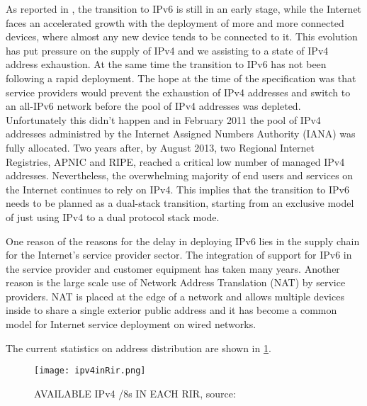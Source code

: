 \documentclass[11pt,a4paper]{scrreprt}
\begin{document}
As reported in \cite{IPv6_state}, the transition to IPv6 is still in an early stage, while the Internet faces an accelerated growth with the deployment of more and more connected devices, where almost any new device tends to be connected to it.  This evolution has put pressure on the supply of IPv4 and we assisting to a state of IPv4 address exhaustion. At the same time the transition to IPv6 has not been following a rapid deployment. The hope at the time of the specification was that service providers would prevent the exhaustion of IPv4 addresses and switch to an all-IPv6 network before the pool of IPv4 addresses was depleted. Unfortunately this didn't happen and in February 2011 the pool of IPv4 addresses administred by the Internet Assigned Numbers Authority (IANA) was fully allocated. Two years after, by August 2013, two Regional Internet Registries, APNIC and RIPE, reached a critical low number of managed IPv4 addresses. Nevertheless, the overwhelming majority of end users and services on the Internet continues to rely on IPv4. This implies that the transition to IPv6 needs to be planned as a dual-stack transition, starting from an exclusive model of just using IPv4 to a dual protocol stack mode.

One reason of the reasons for the delay in deploying IPv6 lies in the supply chain for the Internet's service provider sector. The integration of support for IPv6 in the service provider and customer equipment has taken many years. Another reason is the large scale use of Network Address Translation (NAT) by service providers. NAT is placed at the edge of a network and allows multiple devices inside to share a single exterior public address and it has become a common model for Internet service deployment on wired networks. 

The current statistics on address distribution are shown in \ref{fig:rirs_available_ipv4}.

\begin{figure}[!h]
\centering
\texttt{[image: ipv4inRir.png]}
\caption{AVAILABLE IPv4 /8s IN EACH RIR, source:\cite{IPv4_EACH_RIR}}
\label{fig:rirs_available_ipv4}
\end{figure}
\end{document}
